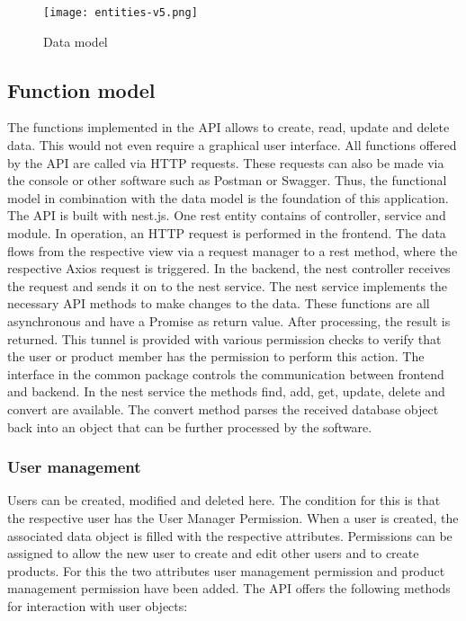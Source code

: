     \begin{figure*}[t]
        \centering
        \texttt{[image: entities-v5.png]}
        \caption{Data model}
        \label{fig: datamodel}
    \end{figure*}

    \subsection*{Function model} 
    The functions implemented in the API allows to create, read, update and delete data. This would not even require a graphical user interface. All functions offered by the API are called via HTTP requests. These requests can also be made via the console or other software such as Postman or Swagger. Thus, the functional model in combination with the data model is the foundation of this application. The API is built with nest.js. One rest entity contains of controller, service and module. In operation, an HTTP request is performed in the frontend. The data flows from the respective view via a request manager to a rest method, where the respective Axios request is triggered. In the backend, the nest controller receives the request and sends it on to the nest service. The nest service implements the necessary API methods to make changes to the data. These functions are all asynchronous and have a Promise as return value. After processing, the result is returned. This tunnel is provided with various permission checks to verify that the user or product member has the permission to perform this action. The interface in the common package controls the communication between frontend and backend. In the nest service the methods find, add, get, update, delete and convert are available. The convert method parses the received database object back into an object that can be further processed by the software.

    \subsubsection*{User management}
    Users can be created, modified and deleted here. The condition for this is that the respective user has the User Manager Permission. When a user is created, the associated data object is filled with the respective attributes. Permissions can be assigned to allow the new user to create and edit other users and to create products. For this the two attributes user management permission and product management permission have been added. The API offers the following methods for interaction with user objects:
    
